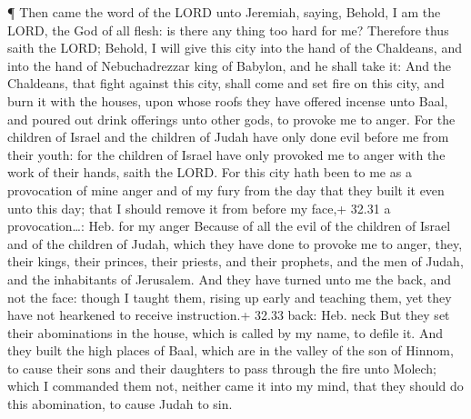  ¶ Then came the word of the LORD unto Jeremiah, saying,
 Behold, I am the LORD, the God of all flesh: is there any
thing too hard for me?  Therefore thus saith the LORD;
Behold, I will give this city into the hand of the Chaldeans, and into
the hand of Nebuchadrezzar king of Babylon, and he shall take it:
 And the Chaldeans, that fight against this city, shall
come and set fire on this city, and burn it with the houses, upon whose
roofs they have offered incense unto Baal, and poured out drink
offerings unto other gods, to provoke me to anger.  For the
children of Israel and the children of Judah have only done evil before
me from their youth: for the children of Israel have only provoked me to
anger with the work of their hands, saith the LORD.  For
this city hath been to me as a provocation of mine anger and of my fury
from the day that they built it even unto this day; that I should remove
it from before my face,+ 32.31 a provocation\ldots: Heb. for my anger
 Because of all the evil of the children of Israel and of
the children of Judah, which they have done to provoke me to anger,
they, their kings, their princes, their priests, and their prophets, and
the men of Judah, and the inhabitants of Jerusalem.  And
they have turned unto me the back, and not the face: though I taught
them, rising up early and teaching them, yet they have not hearkened to
receive instruction.+ 32.33 back: Heb. neck  But they set
their abominations in the house, which is called by my name, to defile
it.  And they built the high places of Baal, which are in
the valley of the son of Hinnom, to cause their sons and their daughters
to pass through the fire unto Molech; which I commanded them not,
neither came it into my mind, that they should do this abomination, to
cause Judah to sin.

